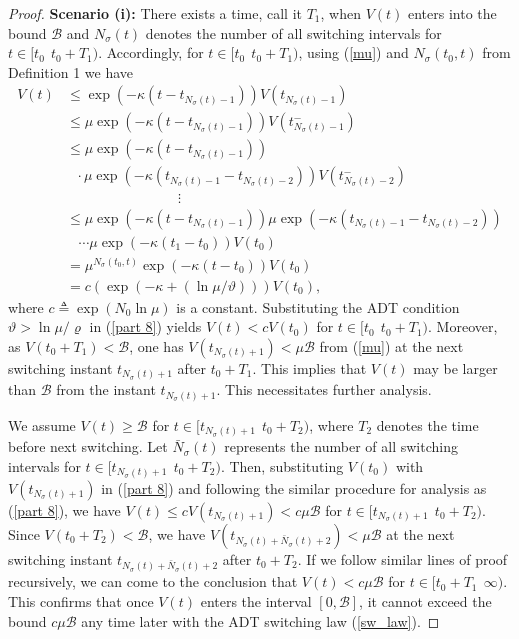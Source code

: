 \documentclass[AMA,STIX1COL,sort, compress]{WileyNJD-v2}
\begin{document}
\begin{proof}
	\textbf{Scenario (i):}
	There exists a time, call it $T_1$, when $V(t)$ enters into the bound $\mathcal{B}$ %
	and $N_{\sigma}(t)$ denotes the number of all switching intervals for $t \in [t_0 ~~t_0+T_1)$. Accordingly, for $t \in [t_0 ~~t_0+T_1)$, using (\ref{mu}) and $N_{\sigma}(t_0,t)$ from Definition 1 we have
	\begin{align}
	V(t)   &\leq \exp \left( - \kappa (t-t_{N_\sigma(t)-1})\right) V(t_{N_\sigma(t)-1}) \nonumber\\
	& \leq \mu\exp \left( - \kappa (t-t_{N_\sigma(t)-1})\right) V(t_{N_\sigma(t)-1}^{-}) \nonumber\\
	& \leq \mu\exp \left( - \kappa (t-t_{N_\sigma(t)-1})\right) \nonumber\\
	&~~~\cdot \mu\exp \left( - \kappa (t_{N_\sigma(t)-1}-t_{N_\sigma(t)-2}) \right)V(t_{N_\sigma(t)-2}^{-}) \nonumber\\
	&\qquad \qquad \qquad \qquad \vdots \nonumber\\
	&\leq \mu\exp \left( - \kappa (t-t_{N_\sigma(t)-1})\right)  \mu\exp \left( - \kappa (t_{N_\sigma(t)-1}-t_{N_\sigma(t)-2}) \right) \nonumber\\
	&~~ ~~\cdots \mu \exp \left( - \kappa (t_1-t_0) \right) V(t_0) \nonumber\\
	&= \mu^{N_{\sigma}(t_0,t)} \exp \left(- \kappa (t-t_0) \right)V(t_0)  \nonumber \\
	& = c \left( \exp \left( -\kappa + ({\ln \mu}/{\vartheta}) \right) \right)V(t_0), \label{part 8}
	\end{align}
	where $c \triangleq \exp \left( N_0 \ln \mu \right) $ is a constant. Substituting the ADT condition $\vartheta > \ln\mu / \varrho $ in (\ref{part 8}) yields $V(t) < c V(t_0)$ for $t \in [t_0 ~~t_0+T_1)$. Moreover, as $V(t_0 +T_1) < \mathcal{B}$, one has $V(t_{N_\sigma(t)+1}) < \mu \mathcal{B}$ from (\ref{mu}) at the next switching instant $t_{N_\sigma(t)+1}$ after $t_0+T_1$. This implies that $V(t)$ may be larger than $\mathcal{B}$ from the instant $t_{N_\sigma(t)+1}$. This necessitates further analysis.
	
	We assume $V(t) \geq \mathcal{B}$ for $t \in [t_{ N_\sigma(t)+1}~~ t_0+T_2)$, where $T_2$ denotes the time before next switching. Let $\bar{{N}}_\sigma (t)$ represents the number of all switching intervals for $t \in [t_{N_\sigma(t)+1}~~ t_0+T_2)$. Then, substituting $V(t_0)$ with $V(t_{N_\sigma (t)+1})$ in (\ref{part 8}) and following the similar procedure for analysis as (\ref{part 8}), we have $V(t) \leq c V(t_{ N_\sigma(t)+1}) < c \mu \mathcal{B}$ for $t \in [t_{ N_\sigma (t)+1}~~ t_0+T_2)$. Since $V(t_0+T_2) < \mathcal{B}$, we have $V(t_{ N_\sigma(t)+\bar{ N}_\sigma(t)+2}) < \mu \mathcal{B}$ at the next switching instant $t_{ N_\sigma(t)+\bar{ N}_\sigma(t)+2}$ after $t_0+T_2$. If we follow similar lines of proof recursively, we can come to the conclusion that $V(t) < c \mu \mathcal{B} $ for $t \in [t_0+T_1~~ \infty )$. This confirms that once $V(t)$ enters the interval $[0,\mathcal{B}]$, it cannot exceed the bound $c\mu \mathcal{B}$ any time later with the ADT switching law (\ref{sw_law}).
	

\end{proof}
\end{document}
